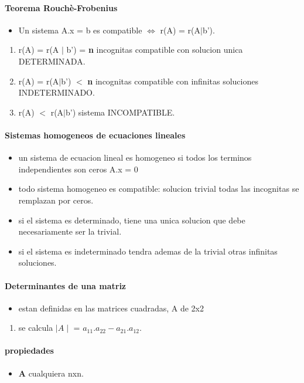 \documentclass[a4paper]{article}
\begin{document}
\paragraph{Teorema Rouchè-Frobenius}
\begin{itemize}
	\item Un sistema A.x = b es compatible $\Leftrightarrow$ r(A) = r(A$\mid$b').
\end{itemize}
\begin{enumerate}
	\item r(A) = r(A $\mid$ b') = \textbf{n} incognitas compatible con solucion unica DETERMINADA.
	\item r(A) = r(A$\mid$b') $<$ \textbf{n} incognitas compatible con infinitas soluciones INDETERMINADO.
	\item r(A) $<$ r(A$\mid$b') sistema INCOMPATIBLE.
\end{enumerate}

\paragraph{Sistemas homogeneos de ecuaciones lineales}
\begin{itemize}
	\item un sistema de ecuacion lineal es homogeneo si todos los terminos independientes son ceros A.x = 0
	\item todo sistema homogeneo es compatible: solucion trivial todas las incognitas se remplazan por ceros.
	\item si el sistema es determinado, tiene una unica solucion que debe necesariamente ser la trivial.
	\item si el sistema es indeterminado tendra ademas de la trivial otras infinitas soluciones.
\end{itemize}

\paragraph{Determinantes de una matriz}
\begin{itemize}
	\item estan definidas en las matrices cuadradas, A de 2x2 
\end{itemize}
\begin{enumerate}
	\item se calcula $\mid A \mid$ = $a_{11}.a_{22} - a_{21}.a_{12}$.
\end{enumerate}

\paragraph{propiedades}
\begin{itemize}
	\item \textbf{A} cualquiera nxn.
\end{itemize}
\end{document}
